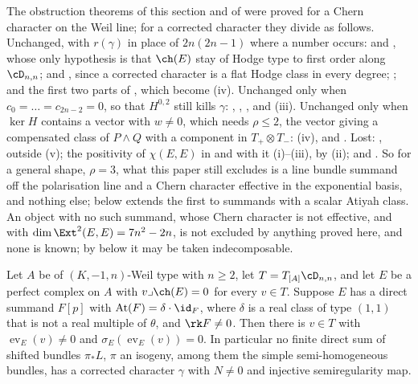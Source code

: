 \begin{remark}
\label{rem:p2primesurvive}
The obstruction theorems of this section and of  were
proved for a Chern character on the Weil line; for a corrected character they
divide as follows. Unchanged, with $r(\gamma)$ in place of $2n(2n-1)$ where a
number occurs:  and , whose only
hypothesis is that $\ch(E)$ stay of Hodge type to first order along
$\cD_{n,n}$;  and , since a
corrected character is a flat Hodge class in every degree;
; and the first two parts of ,
which become (iv). Unchanged only when
$c_{0}=\dots=c_{2n-2}=0$, so that $H^{0,2}$ still kills $\gamma$:
, , ,
 and (iii). Unchanged only when
$\ker H$ contains a vector with $w\ne0$, which needs $\rho\le2$, the vector
giving a compensated class of $P\wedge Q$ with a component in
$T_{+}\otimes T_{-}$: (iv),  and
. Lost:
, outside (v); the positivity of
$\chi(E,E)$ in  and with it (i)--(iii),
by (ii); and . So for a general
shape, $\rho=3$, what this paper still excludes is a line bundle summand off
the polarisation line and a Chern character effective in the exponential
basis, and nothing else;  below extends the first to
summands with a scalar Atiyah class. An object with no such summand, whose
Chern character is not effective, and with $\dim\Ext^{2}(E,E)=7n^{2}-2n$, is
not excluded by anything proved here, and none is known; by
 below it may be taken indecomposable.
\end{remark}

\begin{proposition}\label{prop:scalaratiyah}
Let $A$ be of $(K,-1,n)$-Weil type with $n\ge2$, let $T=T_{[A]}\cD_{n,n}$, and
let $E$ be a perfect complex on $A$ with $v\lrcorner\ch(E)=0$ for every
$v\in T$. Suppose $E$ has a direct summand $F[p]$ with
$\mathrm{At}(F)=\delta\cdot\id_{F}$, where $\delta$ is a real class of type
$(1,1)$ that is not a real multiple of $\theta$, and $\rk F\ne0$. Then there is
$v\in T$ with $\operatorname{ev}_{E}(v)\ne0$ and
$\sigma_{E}(\operatorname{ev}_{E}(v))=0$. In particular no finite direct sum
of shifted bundles $\pi_{*}L$, $\pi$ an isogeny, among them the simple
semi-homogeneous bundles, has a corrected character $\gamma$ with $N\ne0$ and
injective semiregularity map.
\end{proposition}


